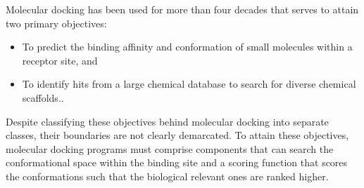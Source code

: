Molecular docking has been used for more than four decades that serves to attain two primary objectives:
\begin{itemize}
    \item To predict the binding affinity and conformation of small molecules within a receptor site, and 
    \item To identify hits from a large chemical database to search for diverse chemical scaffolds.\cite{bib1}. 
\end{itemize}

Despite classifying these objectives behind molecular docking into separate classes, their boundaries are not clearly demarcated. To attain these objectives, molecular docking programs must comprise components that can search the conformational space within the binding site and a scoring function that scores the conformations such that the biological relevant ones are ranked higher.
